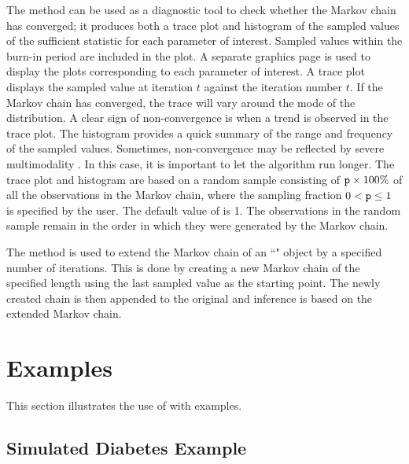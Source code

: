 \documentclass[article, shortnames]{jss}
\begin{document}
The  method can be used as a diagnostic tool to check
whether the Markov chain has converged; it produces both a trace
plot and histogram of the sampled values of the sufficient
statistic for each parameter of interest. Sampled values within
the burn-in period are included in the plot. A separate graphics
page is used to display the plots corresponding to each parameter
of interest. A trace plot displays the sampled value at iteration
$t$ against the iteration number $t$. If the Markov chain has
converged, the trace will vary around the mode of the
distribution. A clear sign of non-convergence is when a trend is
observed in the trace plot. The histogram provides a quick summary
of the range and frequency of the sampled values. Sometimes,
non-convergence may be reflected by severe multimodality
\citep{Gilks:1996}. In this case, it is important to let the
algorithm run longer. The trace plot and histogram are based on a
random sample consisting of $\texttt{p}\times100\%$ of all the
observations in the Markov chain, where the sampling fraction $0 <
\texttt{p} \leq 1$ is specified by the user. The default value of
 is 1. The observations in the random sample remain in the
order in which they were generated by the Markov chain.

The  method is used to extend the Markov chain of
an ``" object by a specified number of iterations. This
is done by creating a new Markov chain of the specified length
using the last sampled value as the starting point. The newly
created chain is then appended to the original and inference is
based on the extended Markov chain.

\section{Examples} \label{Examples}
This section illustrates the use of  with examples.

\subsection{Simulated Diabetes Example}
\end{document}
